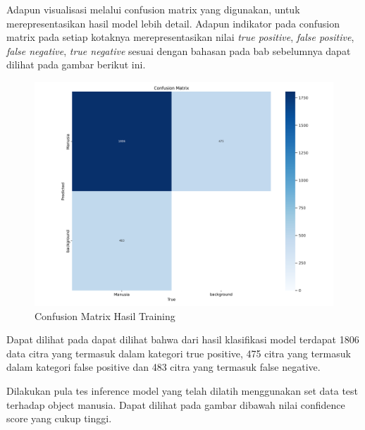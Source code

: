 Adapun visualisasi melalui confusion matrix yang digunakan, untuk merepresentasikan hasil model lebih detail. Adapun indikator pada confusion matrix pada setiap kotaknya merepresentasikan nilai \emph{true positive}, \emph{false positive}, \emph{false negative}, \emph{true negative} sesuai dengan bahasan pada bab sebelumnya dapat dilihat pada gambar berikut ini. 

\begin{figure}[H]
    \centering
    \includegraphics[scale=0.4]{gambar/confusion 100epoch.png}
    \caption{Confusion Matrix Hasil Training}
    \label{fig:visualisasi hasil training}
\end{figure}

Dapat dilihat pada dapat dilihat bahwa dari hasil klasifikasi model terdapat 1806 data citra yang termasuk dalam kategori true positive, 475 citra yang termasuk dalam kategori false positive dan 483 citra yang termasuk false negative.

Dilakukan pula tes inference model yang telah dilatih menggunakan set data test terhadap object manusia. Dapat dilihat pada gambar dibawah nilai confidence score yang cukup tinggi.

